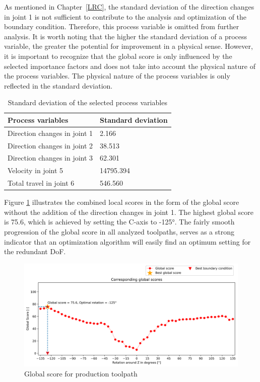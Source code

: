 As mentioned in Chapter~\ref{LRC}, the standard deviation of the direction changes in joint 1 is not sufficient to contribute to the analysis and optimization of the boundary condition. Therefore, this process variable is omitted from further analysis. It is worth noting that the higher the standard deviation of a process variable, the greater the potential for improvement in a physical sense. However, it is important to recognize that the global score is only influenced by the selected importance factors and does not take into account the physical nature of the process variables. The physical nature of the process variables is only reflected in the standard deviation.

\begin{table}[H]
	\centering
	\caption{Standard deviation of the selected process variables}
	\begin{tabular}{||l|l||}
		Process variables & Standard deviation \\
		\hline
		\hline
		\hline
		Direction changes in joint 1	&		2.166 \\
		Direction changes in joint 2	&		38.513 \\
		Direction changes in joint 3	&		62.301 \\
		Velocity in joint 5	&		14795.394 \\
		Total travel in joint 6	&		546.560 \\
		\hline
		\hline
	\end{tabular}
	
	
	\label{Stand}
\end{table}

Figure \ref{GS4} illustrates the combined local scores in the form of the global score without the addition of the direction changes in joint 1. The highest global score is 75.6, which is achieved by setting the C-axis to -125°. %
The fairly smooth progression of the global score in all analyzed toolpaths, serves as a strong indicator that an optimization algorithm will easily find an optimum setting for the redundant \acrshort{DoF}.

\begin{figure}[H]
	\centerline{\includegraphics[width=1\textwidth]{figures/best_c_4.png}}
	\caption{Global score for production toolpath}
	\label{GS4}
\end{figure}


